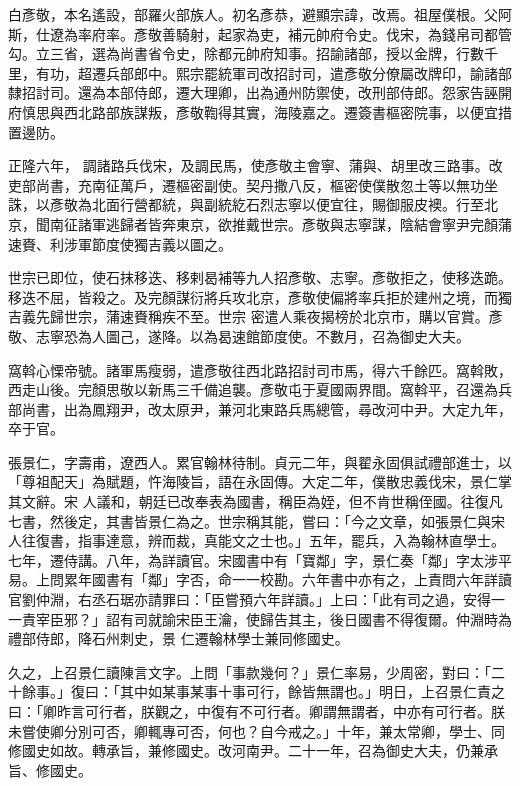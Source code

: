 \begin{pinyinscope}
 白彥敬，本名遙設，部羅火部族人。初名彥恭，避顯宗諱，改焉。祖屋僕根。父阿斯，仕遼為率府率。彥敬善騎射，起家為吏，補元帥府令史。伐宋，為錢帛司都管勾。立三省，選為尚書省令史，除都元帥府知事。招諭諸部，授以金牌，行數千里，有功，超遷兵部郎中。熙宗罷統軍司改招討司，遣彥敬分僚屬改牌印，諭諸部隸招討司。還為本部侍郎，遷大理卿，出為通州防禦使，改刑部侍郎。怨家告誣開府慎思與西北路部族謀叛，彥敬鞫得其實，海陵嘉之。遷簽書樞密院事，以便宜措置邊防。



 正隆六年，
 調諸路兵伐宋，及調民馬，使彥敬主會寧、蒲與、胡里改三路事。改吏部尚書，充南征萬戶，遷樞密副使。契丹撒八反，樞密使僕散忽土等以無功坐誅，以彥敬為北面行營都統，與副統紇石烈志寧以便宜往，賜御服皮襖。行至北京，聞南征諸軍逃歸者皆奔東京，欲推戴世宗。彥敬與志寧謀，陰結會寧尹完顏蒲速賚、利涉軍節度使獨吉義以圖之。



 世宗已即位，使石抹移迭、移剌曷補等九人招彥敬、志寧。彥敬拒之，使移迭跪。移迭不屈，皆殺之。及完顏謀衍將兵攻北京，彥敬使偏將率兵拒於建州之境，而獨吉義先歸世宗，蒲速賚稱疾不至。世宗
 密遣人乘夜揭榜於北京市，購以官賞。彥敬、志寧恐為人圖己，遂降。以為曷速館節度使。不數月，召為御史大夫。



 窩斡心慄帝號。諸軍馬瘦弱，遣彥敬往西北路招討司市馬，得六千餘匹。窩斡敗，西走山後。完顏思敬以新馬三千備追襲。彥敬屯于夏國兩界間。窩斡平，召還為兵部尚書，出為鳳翔尹，改太原尹，兼河北東路兵馬總管，尋改河中尹。大定九年，卒于官。



 張景仁，字壽甫，遼西人。累官翰林待制。貞元二年，與翟永固俱試禮部進士，以「尊祖配天」為賦題，忤海陵旨，語在永固傳。大定二年，僕散忠義伐宋，景仁掌其文辭。宋
 人議和，朝廷已改奉表為國書，稱臣為姪，但不肯世稱侄國。往復凡七書，然後定，其書皆景仁為之。世宗稱其能，嘗曰：「今之文章，如張景仁與宋人往復書，指事達意，辨而裁，真能文之士也。」五年，罷兵，入為翰林直學士。七年，遷侍講。八年，為詳讀官。宋國書中有「寶鄰」字，景仁奏「鄰」字太涉平易。上問累年國書有「鄰」字否，命一一校勘。六年書中亦有之，上責問六年詳讀官劉仲淵，右丞石琚亦請罪曰：「臣嘗預六年詳讀。」上曰：「此有司之過，安得一一責宰臣邪？」詔有司就諭宋臣王瀹，使歸告其主，後日國書不得復爾。仲淵時為禮部侍郎，降石州刺史，景
 仁遷翰林學士兼同修國史。



 久之，上召景仁讀陳言文字。上問「事款幾何？」景仁率易，少周密，對曰：「二十餘事。」復曰：「其中如某事某事十事可行，餘皆無謂也。」明日，上召景仁責之曰：「卿昨言可行者，朕觀之，中復有不可行者。卿謂無謂者，中亦有可行者。朕未嘗使卿分別可否，卿輒專可否，何也？自今戒之。」十年，兼太常卿，學士、同修國史如故。轉承旨，兼修國史。改河南尹。二十一年，召為御史大夫，仍兼承旨、修國史。




\end{pinyinscope}

